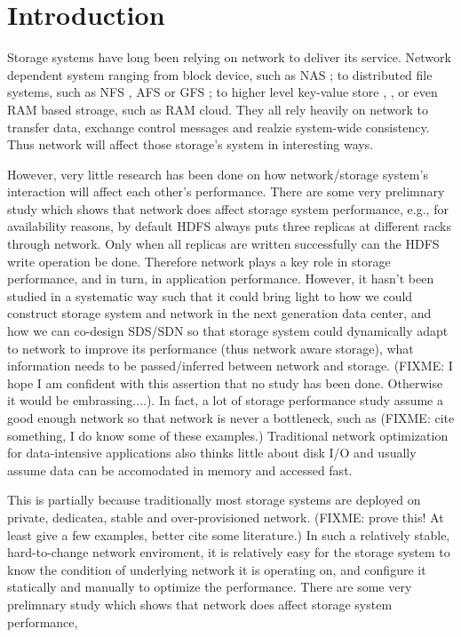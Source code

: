 \section{Introduction}
\label{section:intro}

Storage systems have long been relying on network to deliver its service. Network dependent system ranging from block device, such as NAS \cite{nas}; to distributed file systems, such as NFS \cite{nfs}, AFS \cite{afs} or GFS \cite{gfs}; to higher level key-value store \cite{dynamo}, \cite{big-table}, or even RAM based stroage, such as RAM cloud. They all rely heavily on network to transfer data, exchange control messages and realzie system-wide consistency. Thus network will affect those storage's system in interesting ways.

However, very little research has been done on how network/storage system's interaction will affect each other's performance. There are some very prelimnary study which shows that network does affect storage system performance, e.g., for availability reasons, by default HDFS always puts three replicas at different racks through network. Only when all replicas are written successfully can the HDFS write operation be done. Therefore network plays a key role in storage performance, and in turn, in application performance. However, it hasn't been studied in a systematic way such that it could bring light to how we could construct storage system and network in the next generation data center, and how we can co-design SDS/SDN so that storage system could dynamically adapt to network to improve its performance (thus network aware storage), what information needs to be passed/inferred between network and storage. (FIXME: I hope I am confident with this assertion that no study has been done. Otherwise it would be embrassing....). In fact, a lot of storage performance study assume a good enough network so that network is never a bottleneck, such as (FIXME: cite something, I do know some of these examples.) Traditional network optimization for data-intensive applications also thinks little about disk I/O and usually assume data can be accomodated in memory and accessed fast.

This is partially because traditionally most storage systems are deployed on private, dedicatea, stable and over-provisioned network. (FIXME: prove this! At least give a few examples, better cite some literature.) In such a relatively stable, hard-to-change network enviroment, it is relatively easy for the storage system to know the condition of underlying network it is operating on, and configure it statically and manually to optimize the performance. There are some very prelimnary study which shows that network does affect storage system performance, 

